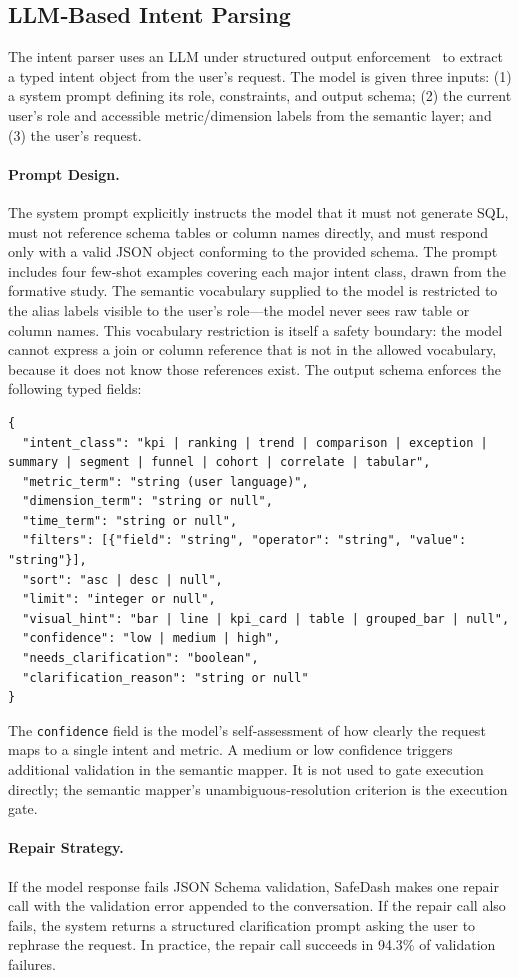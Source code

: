 \documentclass[11pt]{article}
\begin{document}
\subsection{LLM‑Based Intent Parsing}
The intent parser uses an LLM under structured output enforcement~\cite{openai2024structured} to extract a typed intent object from the user's request. The model is given three inputs: (1) a system prompt defining its role, constraints, and output schema; (2) the current user's role and accessible metric/dimension labels from the semantic layer; and (3) the user's request.

\paragraph{Prompt Design.} The system prompt explicitly instructs the model that it must not generate SQL, must not reference schema tables or column names directly, and must respond only with a valid JSON object conforming to the provided schema. The prompt includes four few‑shot examples covering each major intent class, drawn from the formative study. The semantic vocabulary supplied to the model is restricted to the alias labels visible to the user's role—the model never sees raw table or column names. This vocabulary restriction is itself a safety boundary: the model cannot express a join or column reference that is not in the allowed vocabulary, because it does not know those references exist. The output schema enforces the following typed fields:
\begin{verbatim}
{
  "intent_class": "kpi | ranking | trend | comparison | exception | summary | segment | funnel | cohort | correlate | tabular",
  "metric_term": "string (user language)",
  "dimension_term": "string or null",
  "time_term": "string or null",
  "filters": [{"field": "string", "operator": "string", "value": "string"}],
  "sort": "asc | desc | null",
  "limit": "integer or null",
  "visual_hint": "bar | line | kpi_card | table | grouped_bar | null",
  "confidence": "low | medium | high",
  "needs_clarification": "boolean",
  "clarification_reason": "string or null"
}
\end{verbatim}
The \texttt{confidence} field is the model's self‑assessment of how clearly the request maps to a single intent and metric. A medium or low confidence triggers additional validation in the semantic mapper. It is not used to gate execution directly; the semantic mapper's unambiguous‑resolution criterion is the execution gate.

\paragraph{Repair Strategy.} If the model response fails JSON Schema validation, SafeDash makes one repair call with the validation error appended to the conversation. If the repair call also fails, the system returns a structured clarification prompt asking the user to rephrase the request. In practice, the repair call succeeds in 94.3\% of validation failures.
\end{document}
